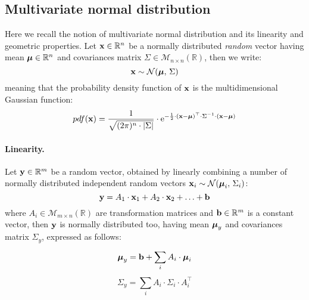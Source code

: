 \subsection{Multivariate normal distribution}
	\label{app.multinormal}
	
	Here we recall the notion of multivariate normal distribution and its linearity and geometric properties.
	Let $\boldsymbol{\mathrm{{x}}} \in \mathbb{R}^n$ be a normally distributed \emph{random} vector having mean $\boldsymbol{\mathrm{{\mu}}} \in \mathbb{R}^n$ and covariances matrix $\Sigma \in \mathcal{M}_{n \times n}(\mathbb{R})$, then we write: 
	\[
		\boldsymbol{\mathrm{{x}}} \sim \mathcal{N}(\boldsymbol{\mathrm{{\mu}}},\, \Sigma)
	\]
	meaning that the probability density function of $\boldsymbol{\mathrm{{x}}}$ is the multidimensional Gaussian function:
	\[
		pdf(\boldsymbol{\mathrm{{x}}}) = \frac{1}{\sqrt{(2\pi)^n \cdot |\Sigma|}} \cdot \mathrm{e}^{-\frac{1}{2} \cdot (\boldsymbol{\mathrm{{x}}} - \boldsymbol{\mathrm{{\mu}}})^\top \cdot \Sigma^{-1} \cdot (\boldsymbol{\mathrm{{x}}} - \boldsymbol{\mathrm{{\mu}}})}
	\]
	
	\paragraph{Linearity.}
		Let $\boldsymbol{\mathrm{{y}}} \in \mathbb{R}^m$ be a random vector, obtained by linearly combining a number of normally distributed independent random vectors $\boldsymbol{\mathrm{{x}}}_i \sim \mathcal{N}(\boldsymbol{\mathrm{{\mu}}}_i,\, \Sigma_i)$:
		\[
			\boldsymbol{\mathrm{{y}}} = A_1 \cdot \boldsymbol{\mathrm{{x}}}_1 + A_2 \cdot \boldsymbol{\mathrm{{x}}}_2 + \ldots + \boldsymbol{\mathrm{{b}}}
		\]
		where $A_i \in \mathcal{M}_{m \times n}(\mathbb{R})$ are transformation matrices and $\boldsymbol{\mathrm{{b}}} \in \mathbb{R}^m$ is a constant vector, then $\boldsymbol{\mathrm{{y}}}$ is normally distributed too, having mean $\boldsymbol{\mathrm{{\mu}}}_y$ and covariances matrix $\Sigma_y$, expressed as follows:
		\begin{equation}
			\boldsymbol{\mathrm{{\mu}}}_y = \boldsymbol{\mathrm{{b}}} + \sum_{i}^{} A_i \cdot \boldsymbol{\mathrm{{\mu}}}_i
		\end{equation}
		\begin{equation}
			\Sigma_y = \sum_{i}^{} A_i \cdot \Sigma_i \cdot A_i^\top
		\end{equation}
		
